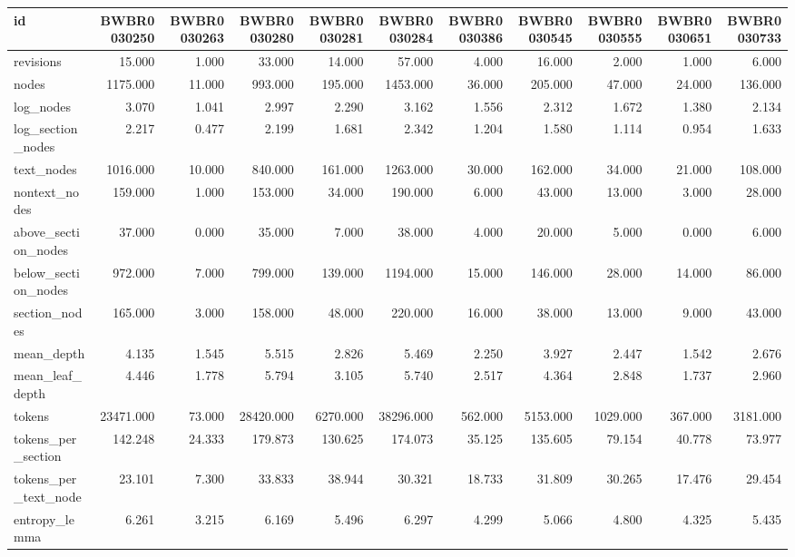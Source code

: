 \begin{tabular}{lrrrrrrrrrr}
\toprule
id & BWBR0030250 & BWBR0030263 & BWBR0030280 & BWBR0030281 & BWBR0030284 & BWBR0030386 & BWBR0030545 & BWBR0030555 & BWBR0030651 & BWBR0030733 \\
\midrule
revisions & 15.000 & 1.000 & 33.000 & 14.000 & 57.000 & 4.000 & 16.000 & 2.000 & 1.000 & 6.000 \\
\cline{1-11}
nodes & 1175.000 & 11.000 & 993.000 & 195.000 & 1453.000 & 36.000 & 205.000 & 47.000 & 24.000 & 136.000 \\
\cline{1-11}
log\_nodes & 3.070 & 1.041 & 2.997 & 2.290 & 3.162 & 1.556 & 2.312 & 1.672 & 1.380 & 2.134 \\
\cline{1-11}
log\_section\_nodes & 2.217 & 0.477 & 2.199 & 1.681 & 2.342 & 1.204 & 1.580 & 1.114 & 0.954 & 1.633 \\
\cline{1-11}
text\_nodes & 1016.000 & 10.000 & 840.000 & 161.000 & 1263.000 & 30.000 & 162.000 & 34.000 & 21.000 & 108.000 \\
\cline{1-11}
nontext\_nodes & 159.000 & 1.000 & 153.000 & 34.000 & 190.000 & 6.000 & 43.000 & 13.000 & 3.000 & 28.000 \\
\cline{1-11}
above\_section\_nodes & 37.000 & 0.000 & 35.000 & 7.000 & 38.000 & 4.000 & 20.000 & 5.000 & 0.000 & 6.000 \\
\cline{1-11}
below\_section\_nodes & 972.000 & 7.000 & 799.000 & 139.000 & 1194.000 & 15.000 & 146.000 & 28.000 & 14.000 & 86.000 \\
\cline{1-11}
section\_nodes & 165.000 & 3.000 & 158.000 & 48.000 & 220.000 & 16.000 & 38.000 & 13.000 & 9.000 & 43.000 \\
\cline{1-11}
mean\_depth & 4.135 & 1.545 & 5.515 & 2.826 & 5.469 & 2.250 & 3.927 & 2.447 & 1.542 & 2.676 \\
\cline{1-11}
mean\_leaf\_depth & 4.446 & 1.778 & 5.794 & 3.105 & 5.740 & 2.517 & 4.364 & 2.848 & 1.737 & 2.960 \\
\cline{1-11}
tokens & 23471.000 & 73.000 & 28420.000 & 6270.000 & 38296.000 & 562.000 & 5153.000 & 1029.000 & 367.000 & 3181.000 \\
\cline{1-11}
tokens\_per\_section & 142.248 & 24.333 & 179.873 & 130.625 & 174.073 & 35.125 & 135.605 & 79.154 & 40.778 & 73.977 \\
\cline{1-11}
tokens\_per\_text\_node & 23.101 & 7.300 & 33.833 & 38.944 & 30.321 & 18.733 & 31.809 & 30.265 & 17.476 & 29.454 \\
\cline{1-11}
entropy\_lemma & 6.261 & 3.215 & 6.169 & 5.496 & 6.297 & 4.299 & 5.066 & 4.800 & 4.325 & 5.435 \\

\end{tabular}
